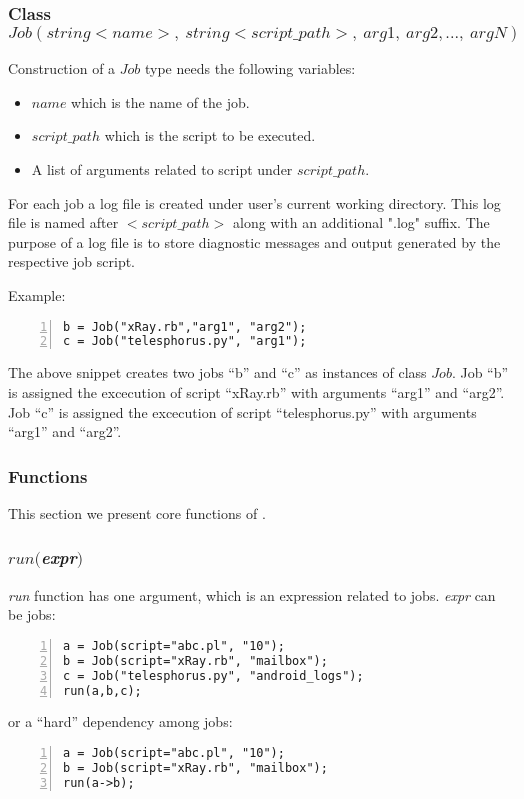\subsubsection*{Class $Job(string <name>,~ string <script\_path>,~arg1,~arg2, ...,~argN)$}
Construction of a $Job$ type needs the following variables:
\begin{itemize}
\item $name$ which is the name of the job.
\item $script\_path$ which is the script to be executed.
\item A list of arguments related to script under $script\_path$.\\
\end{itemize}
For each \lang{} job a log file is created under user's current working directory. This
log file is named after $<script\_path>$ along with an additional ".log" suffix. The purpose
of a log file is to store diagnostic messages and output generated by the respective job script.

Example:
\begin{Verbatim}[numbers=left]
b = Job("xRay.rb","arg1", "arg2");
c = Job("telesphorus.py", "arg1");
\end{Verbatim}

The above snippet creates two jobs ``b'' and ``c'' as instances of class $Job$.
Job ``b'' is assigned the excecution of script ``xRay.rb'' with arguments ``arg1'' and ``arg2''.
Job ``c'' is assigned the excecution of script ``telesphorus.py'' with arguments ``arg1'' and ``arg2''.


\subsubsection*{\lang{} Functions}

This section we present core functions of \lang{}.
\subsubsection*{$run($\textit{expr}$)$}
\textit{run} function has one argument, which is an expression related to jobs.
\textit{expr} can be jobs:
\begin{Verbatim}[numbers=left]
a = Job(script="abc.pl", "10");
b = Job(script="xRay.rb", "mailbox");
c = Job("telesphorus.py", "android_logs");
run(a,b,c);
\end{Verbatim}

or a ``hard'' dependency among jobs:
\begin{Verbatim}[numbers=left]
a = Job(script="abc.pl", "10");
b = Job(script="xRay.rb", "mailbox");
run(a->b);
\end{Verbatim}
